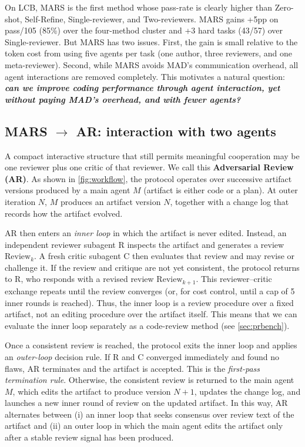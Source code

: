 \documentclass{article}
\begin{document}
On LCB, MARS is
the first method whose pass-rate is clearly higher than Zero-shot,
Self-Refine, Single-reviewer, and Two-reviewers. MARS gains +5pp on
pass/105 (85\%) over the four-method cluster and +3 hard tasks (43/57) over
Single-reviewer. But MARS has two issues. First, the gain is small
relative to the token cost from using five agents per task (one author,
three reviewers, and one meta-reviewer). Second, while MARS avoids
MAD's communication overhead, all agent interactions are removed
completely. This motivates a natural question:
\textit{\textbf{can we improve coding performance through agent
interaction, yet without paying MAD's overhead, and with fewer
agents?}}

\subsection{MARS $\to$ AR: interaction with two agents}
\label{sec:lcb-ar}

A compact interactive structure that still permits meaningful
cooperation may be one reviewer plus one critic of that reviewer. We call
this \textbf{Adversarial Review (AR)}. As shown in
\autoref{fig:workflow}, the protocol operates over successive artifact
versions produced by a main agent $M$ (artifact is either code or a plan). At outer iteration $N$, $M$
produces an artifact version $N$, together with
a change log that records how the artifact evolved.

AR then enters an \emph{inner loop} in which the artifact is never edited. Instead,
an independent reviewer subagent R inspects the artifact and generates a review
$\mathrm{Review}_k$. A fresh critic subagent C then evaluates
that review and may revise or challenge it. If the review and critique
are not yet consistent, the protocol returns to R, who responds with
a revised review $\mathrm{Review}_{k+1}$. This reviewer--critic
exchange repeats until the review converges (or, for cost control,
until a cap of 5 inner rounds is reached). Thus, the inner loop is
a review procedure over a fixed artifact, not an editing
procedure over the artifact itself. This means that we can evaluate the inner loop separately as a code-review method (see \autoref{sec:prbench}).

Once a consistent review is reached, the protocol exits the inner loop
and applies an \textit{outer-loop }decision rule. If R and C converged immediately and found no flaws, AR terminates and the
artifact is accepted. This is the \emph{first-pass termination rule}.
Otherwise, the consistent review is returned to the main agent $M$,
which edits the artifact to produce version $N{+}1$, updates the change
log, and launches a new inner round of review on the updated artifact. In
this way, AR alternates between (i) an inner loop that seeks consensus
over review text of the artifact and (ii) an outer loop in which
the main agent edits the artifact only after a stable review signal has
been produced.
\end{document}
